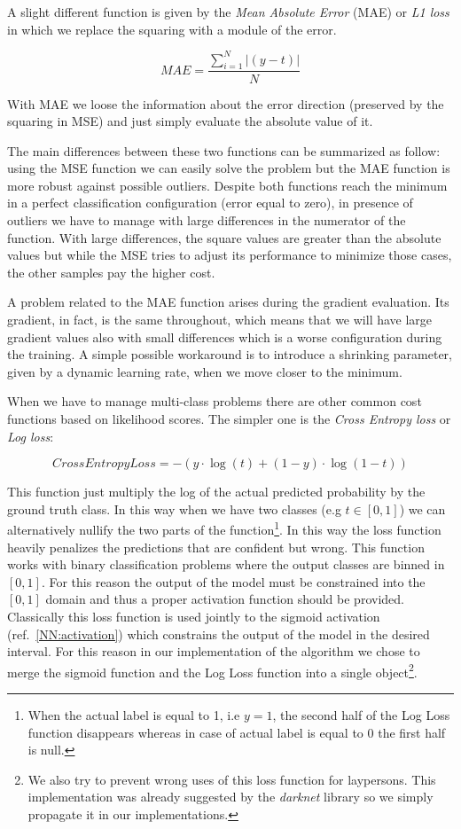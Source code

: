 \documentclass{standalone}
\begin{document}
A slight different function is given by the \emph{Mean Absolute Error} (MAE) or \emph{L1 loss} in which we replace the squaring with a module of the error.

$$
MAE = \frac{\sum_{i=1}^{N}|\left( y - t \right)|}{N}
$$

With MAE we loose the information about the error direction (preserved by the squaring in MSE) and just simply evaluate the absolute value of it.

The main differences between these two functions can be summarized as follow: using the MSE function we can easily solve the problem but the MAE function is more robust against possible outliers.
Despite both functions reach the minimum in a perfect classification configuration (error equal to zero), in presence of outliers we have to manage with large differences in the numerator of the function.
With large differences, the square values are greater than the absolute values but while the MSE tries to adjust its performance to minimize those cases, the other samples pay the higher cost.

A problem related to the MAE function arises during the gradient evaluation.
Its gradient, in fact, is the same throughout, which means that we will have large gradient values also with small differences which is a worse configuration during the training.
A simple possible workaround is to introduce a shrinking parameter, given by a dynamic learning rate, when we move closer to the minimum.

When we have to manage multi-class problems there are other common cost functions based on likelihood scores.
The simpler one is the \emph{Cross Entropy loss} or \emph{Log loss}:

$$
CrossEntropyLoss = -(y\cdot\log(t) + (1 - y)\cdot\log(1 - t))
$$

This function just multiply the log of the actual predicted probability by the ground truth class.
In this way when we have two classes (e.g $t \in [0, 1]$) we can alternatively nullify the two parts of the function\footnote{
  When the actual label is equal to 1, i.e $y=1$, the second half of the Log Loss function disappears whereas in case of actual label is equal to 0 the first half is null.
}.
In this way the loss function heavily penalizes the predictions that are confident but wrong.
This function works with binary classification problems where the output classes are binned in $[0, 1]$.
For this reason the output of the model must be constrained into the $[0, 1]$ domain and thus a proper activation function should be provided.
Classically this loss function is used jointly to the sigmoid activation (ref.~\ref{NN:activation}) which constrains the output of the model in the desired interval.
For this reason in our implementation of the algorithm we chose to merge the sigmoid function and the Log Loss function into a single object\footnote{
  We also try to prevent wrong uses of this loss function for laypersons.
  This implementation was already suggested by the \emph{darknet} library so we simply propagate it in our implementations.
}.
\end{document}
